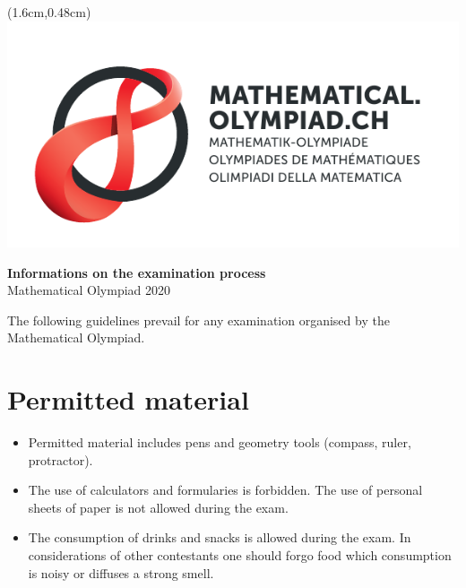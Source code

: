\documentclass[12pt,a4paper]{article}
\begin{document}
\thispagestyle{empty}

\begin{textblock*}{\paperwidth}(1.6cm,0.48cm) %
\includegraphics[scale=0.67]{Logo_Mathematik_CMYK.pdf}
\end{textblock*}

\vspace*{1.5cm}

\begin{center}
\Huge{\textbf{Informations on the examination process}}\\
\large{Mathematical Olympiad 2020}
\end{center}

\bigskip

The following guidelines prevail for any examination organised by the Mathematical Olympiad.

\section{Permitted material}
\begin{itemize}
\item Permitted material includes pens and geometry tools (compass, ruler, protractor).
\item The use of calculators and formularies is forbidden. The use of personal sheets of paper is not allowed during the exam.
\item The consumption of drinks and snacks is allowed during the exam. In considerations of other contestants one should forgo food which consumption is noisy or diffuses a strong smell.
\end{itemize}
\end{document}
